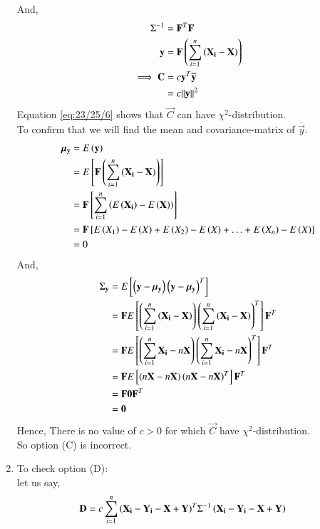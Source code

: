 \documentclass[journal,12pt,onecolumn]{IEEEtran}
\theoremstyle{remark}
\begin{document}
\begin{enumerate}[label=(\alph*)]
And,
\begin{align}
{\Sigma}^{-1} &= {\vec{F}}^T\vec{F}  \\
\vec{y} &= \vec{F}\brak{\sum_{i=1}^{n}\brak{\vec{X_i}-\vec{X}}} \\
\implies \vec{C} &= c{\vec{y}}^T\overline{\vec{y}} \\
                 &= c{\norm{\vec{y}}}^2  \label{eq:23/25/6}
\end{align}
Equation \eqref{eq:23/25/6} shows that $\vec{C}$ can have ${\chi}^2$-distribution. \\
To confirm that we will find the mean and covariance-matrix of $\overline{\vec{y}}$.
\begin{align}
{\bm{\mu}}_{\mathbf{y}} &= E\left(\mathbf{y}\right) \\
                     &= E{}\left[\mathbf{F}\left(\sum_{i=1}^{n}\left(\mathbf{X_i}-\mathbf{X}\right)\right)\right] \\
                     &= \mathbf{F}{}\left[\sum_{i=1}^{n}\left(E\left(\mathbf{X_i}\right)-E\left(\mathbf{X}\right)\right)\right] \\
                     &= \mathbf{F}{}\left[E\left(X_1\right)-E\left(X\right)+E\left(X_2\right)-E\left(X\right)+\ldots+E\left(X_n\right)-E\left(X\right)\right]\\
                     &= 0
\end{align}
And,
\begin{align}
{\Sigma}_{\mathbf{y}} &= E{}\left[\left(\mathbf{y}-{\bm{\mu}}_{\mathbf{y}}\right){\left(\mathbf{y}-{\bm{\mu}}_{\mathbf{y}}\right)}^T\right] \\
                   &= \mathbf{F}E{}\left[\left(\sum_{i=1}^{n}\left(\mathbf{X_i}-\mathbf{X}\right)\right){\left(\sum_{i=1}^{n}\left(\mathbf{X_i}-\mathbf{X}\right)\right)}^T\right]{\mathbf{F}}^T \\
                   &= \mathbf{F}E{}\left[\left(\sum_{i=1}^{n}\mathbf{X_i}-n\mathbf{X}\right){\left(\sum_{i=1}^{n}\mathbf{X_i}-n\mathbf{X}\right)}^T\right]{\mathbf{F}}^T \\
                   &= \mathbf{F}E{}\left[\left(n\mathbf{X}-n\mathbf{X}\right){\left(n\mathbf{X}-n\mathbf{X}\right)}^T\right]{\mathbf{F}}^T \\
                   &= \mathbf{F}\bm{0}{\mathbf{F}}^T  \\
                   &= \bm{0} 
\end{align}
Hence, There is no value of $c>0$ for which $\vec{C}$ have ${\chi}^2$-distribution.\\
So option (C) is incorrect.
\item To check option (D): \\
let us say,
\begin{align}
\vec{D} &= c\sum_{i=1}^n{\brak{\vec{X_i}-\vec{Y_i}-\vec{X}+\vec{Y}}}^T{\Sigma}^{-1}\brak{\vec{X_i}-\vec{Y_i}-\vec{X}+\vec{Y}}

\end{align}
\end{enumerate}
\end{document}
